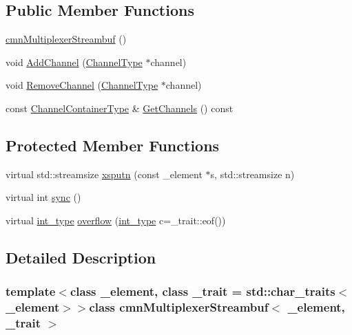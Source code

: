 \subsection*{Public Member Functions}
\begin{DoxyCompactItemize}
\item 
\hyperlink{classcmn_multiplexer_streambuf_a756cefd50738a086f4a5c99c69907f7b}{cmn\-Multiplexer\-Streambuf} ()
\item 
void \hyperlink{classcmn_multiplexer_streambuf_a1e33a4858eb94ed085987ddbcc01a1d0}{Add\-Channel} (\hyperlink{classcmn_multiplexer_streambuf_a7eb353f0b5fed1a2c8707712aac82095}{Channel\-Type} $\ast$channel)
\item 
void \hyperlink{classcmn_multiplexer_streambuf_affd9794b9412295cf157d204fc71cf8e}{Remove\-Channel} (\hyperlink{classcmn_multiplexer_streambuf_a7eb353f0b5fed1a2c8707712aac82095}{Channel\-Type} $\ast$channel)
\item 
const \hyperlink{classcmn_multiplexer_streambuf_a3b414c7f89b55584aef7c8b655bc03ea}{Channel\-Container\-Type} \& \hyperlink{classcmn_multiplexer_streambuf_af2b0f1faceb2ab33e317f2074ca88e15}{Get\-Channels} () const 
\end{DoxyCompactItemize}
\subsection*{Protected Member Functions}
\begin{DoxyCompactItemize}
\item 
virtual std\-::streamsize \hyperlink{classcmn_multiplexer_streambuf_a0e5181e114c169527135d01b28d94169}{xsputn} (const \-\_\-element $\ast$s, std\-::streamsize n)
\item 
virtual int \hyperlink{classcmn_multiplexer_streambuf_a3e1f49548cb968afcdeabe62da5a5ae9}{sync} ()
\item 
virtual \hyperlink{classcmn_multiplexer_streambuf_aaa63d7e4ef3d7ef78dee540971ec88e9}{int\-\_\-type} \hyperlink{classcmn_multiplexer_streambuf_a90999d31356176b52174452e2a43c1ae}{overflow} (\hyperlink{classcmn_multiplexer_streambuf_aaa63d7e4ef3d7ef78dee540971ec88e9}{int\-\_\-type} c=\-\_\-trait\-::eof())
\end{DoxyCompactItemize}


\subsection{Detailed Description}
\subsubsection*{template$<$class \-\_\-element, class \-\_\-trait = std\-::char\-\_\-traits$<$\-\_\-element$>$$>$class cmn\-Multiplexer\-Streambuf$<$ \-\_\-element, \-\_\-trait $>$}

